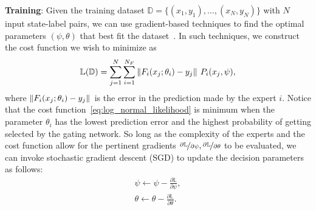 \textbf{Training}: Given the training dataset $\mathbb{D} = \{(x_1, y_1), \dots,
(x_N, y_N)\}$ with $N$ input state-label pairs, we can use gradient-based
techniques to find the optimal parameters $(\psi, \theta)$ that best fit
the dataset~\cite{chen2022towards}.
%
In such techniques, we construct the cost function we wish to minimize as
\begin{align}
  \mathbb{L}(\mathbb{D})= \sum_{j=1}^{N} \sum_{i=1}^{N_F} \|{F_i(x_j; \theta_i) - y_j}\|_{{}_{}} \; P_i(x_j, \psi),
  \label{eq:log_normal_likelihood}
\end{align}
\noindent where $\|{F_i(x_j; \theta_i) - y_j}\|_{{}_{}}$ is the error in the
prediction made by the expert $i$. 
% 
%
Notice that the cost function~\eqref{eq:log_normal_likelihood} is minimum
when the parameter $\theta_i$ has the lowest prediction error and the highest
probability of getting selected by the gating network.
%
So long as the complexity of the experts and the cost function allow for the
pertinent gradients $\nicefrac{\partial \mathbb{L}}{\partial \psi},
\nicefrac{\partial \mathbb{L}}{\partial \theta}$ to be evaluated, we can
invoke stochastic gradient descent (SGD) to update the decision parameters as
follows:
\begin{align*}
  \psi \leftarrow \psi - \frac{\partial \mathbb{L}}{\partial \psi}, \\
  \theta \leftarrow \theta - \frac{\partial \mathbb{L}}{\partial \theta}.
\end{align*}

